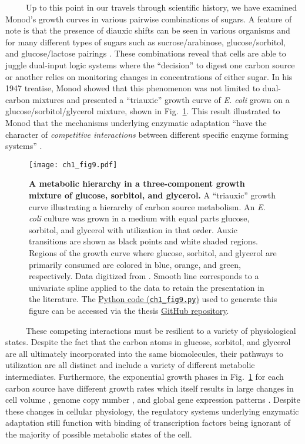\documentclass[12pt]{caltech_thesis}
\begin{document}
~~~~~Up to this point in our travels through scientific history, we have
examined Monod's growth curves in various pairwise combinations of
sugars. A feature of note is that the presence of diauxic shifts can be
seen in various organisms and for many different types of sugars such as
sucrose/arabinose, glucose/sorbitol, and glucose/lactose pairings
\autocite{monod1947}. These combinations reveal that cells are able to
juggle dual-input logic systems where the ``decision'' to digest one
carbon source or another relies on monitoring changes in concentrations
of either sugar. In his 1947 treatise, Monod showed that this phenomenon
was not limited to dual-carbon mixtures and presented a ``triauxic''
growth curve of \emph{E. coli} grown on a glucose/sorbitol/glycerol
mixture, shown in Fig.~\ref{fig:triauxic_growth}. This result
illustrated to Monod that the mechanisms underlying enzymatic adaptation
``have the character of \emph{competitive interactions} between
different specific enzyme forming systems'' \autocite{monod1947}.

\hypertarget{fig:triauxic_growth}{%
\begin{figure}
\centering
\texttt{[image: ch1\_fig9.pdf]}
\caption[{A metabolic hierarchy in a growth medium containing glucose,
sorbitol, and glycerol.}]{\textbf{A metabolic hierarchy in a
three-component growth mixture of glucose, sorbitol, and glycerol.} A
``triauxic'' growth curve illustrating a hierarchy of carbon source
metabolism. An \emph{E. coli} culture was grown in a medium with equal
parts glucose, sorbitol, and glycerol with utilization in that order.
Auxic transitions are shown as black points and white shaded regions.
Regions of the growth curve where glucose, sorbitol, and glycerol are
primarily consumed are colored in blue, orange, and green, respectively.
Data digitized from \textcite{monod1947}. Smooth line corresponds to a
univariate spline applied to the data to retain the presentation in the
literature. The
\href{https://github.com/gchure/phd/blob/master/src/chapter_01/code/ch1_fig9.py}{Python
code (\texttt{ch1\_fig9.py})} used to generate this figure can be
accessed via the thesis \href{https://github.com/gchure/phd}{GitHub
repository}.}
\label{fig:triauxic_growth}
\end{figure}
}

~~~~~These competing interactions must be resilient to a variety of
physiological states. Despite the fact that the carbon atoms in glucose,
sorbitol, and glycerol are all ultimately incorporated into the same
biomolecules, their pathways to utilization are all distinct and include
a variety of different metabolic intermediates. Furthermore, the
exponential growth phases in Fig.~\ref{fig:triauxic_growth} for each
carbon source have different growth rates which itself results in large
changes in cell volume \autocite{taheri-araghi2015,jun2018}, genome copy
number \autocite{nordstrom2006}, and global gene expression patterns
\autocite{li2014,schmidt2016,hui2015}. Despite these changes in cellular
physiology, the regulatory systems underlying enzymatic adaptation still
function with binding of transcription factors being ignorant of the
majority of possible metabolic states of the cell.
\end{document}
